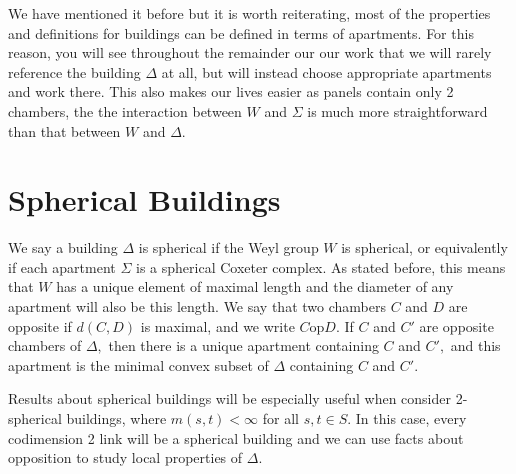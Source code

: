 \documentclass[class=book, crop=false,12 pt]{standalone}
\begin{document}
We have mentioned it before but it is worth reiterating, most of the properties and definitions for buildings can be defined in terms of apartments. For this reason, you will see throughout the remainder our our work that we will rarely reference the building $\Delta$ at all, but will instead choose appropriate apartments and work there. This also makes our lives easier as panels contain only 2 chambers, the the interaction between $W$ and $\Sigma$ is much more straightforward than that between $W$ and $\Delta.$ 

\section{Spherical Buildings}
We say a building $\Delta$ is spherical if the Weyl group $W$ is spherical, or equivalently if each apartment $\Sigma$ is a spherical Coxeter complex. As stated before, this means that $W$ has a unique element of maximal length and the diameter of any apartment will also be this length. We say that two chambers $C$ and $D$ are opposite if $d(C,D)$ is maximal, and we write $C \mathrm{ op }D.$ If $C$ and $C'$ are opposite chambers of $\Delta,$ then there is a unique apartment containing $C$ and $C',$ and this apartment is the minimal convex subset of $\Delta$ containing $C$ and $C'.$ 

Results about spherical buildings will be especially useful when consider 2-spherical buildings, where $m(s,t)<\infty$ for all $s,t\in S.$ In this case, every codimension 2 link will be a spherical building and we can use facts about opposition to study local properties of $\Delta.$
\end{document}
